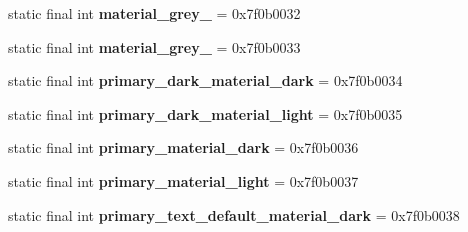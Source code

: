 \begin{DoxyCompactItemize}
\item 
\hypertarget{classandroid_1_1support_1_1v7_1_1appcompat_1_1_r_1_1color_a2e6e9968a655a16317a5d332fa831f10}{}static final int {\bfseries material\+\_\+grey\+\_} = 0x7f0b0032\label{classandroid_1_1support_1_1v7_1_1appcompat_1_1_r_1_1color_a2e6e9968a655a16317a5d332fa831f10}

\item 
\hypertarget{classandroid_1_1support_1_1v7_1_1appcompat_1_1_r_1_1color_a6ec6c6585de5abf315a0289cbf5e3584}{}static final int {\bfseries material\+\_\+grey\+\_} = 0x7f0b0033\label{classandroid_1_1support_1_1v7_1_1appcompat_1_1_r_1_1color_a6ec6c6585de5abf315a0289cbf5e3584}

\item 
\hypertarget{classandroid_1_1support_1_1v7_1_1appcompat_1_1_r_1_1color_a6f3197ffaef2c0dc4af0f27aa444a0e3}{}static final int {\bfseries primary\+\_\+dark\+\_\+material\+\_\+dark} = 0x7f0b0034\label{classandroid_1_1support_1_1v7_1_1appcompat_1_1_r_1_1color_a6f3197ffaef2c0dc4af0f27aa444a0e3}

\item 
\hypertarget{classandroid_1_1support_1_1v7_1_1appcompat_1_1_r_1_1color_abc7e36eaa8300f0592fdf83fd2cdb2bd}{}static final int {\bfseries primary\+\_\+dark\+\_\+material\+\_\+light} = 0x7f0b0035\label{classandroid_1_1support_1_1v7_1_1appcompat_1_1_r_1_1color_abc7e36eaa8300f0592fdf83fd2cdb2bd}

\item 
\hypertarget{classandroid_1_1support_1_1v7_1_1appcompat_1_1_r_1_1color_a56f0defd568d11f4259dceccf4848b29}{}static final int {\bfseries primary\+\_\+material\+\_\+dark} = 0x7f0b0036\label{classandroid_1_1support_1_1v7_1_1appcompat_1_1_r_1_1color_a56f0defd568d11f4259dceccf4848b29}

\item 
\hypertarget{classandroid_1_1support_1_1v7_1_1appcompat_1_1_r_1_1color_ad93abfea5fcbd22376aeea41048ee7c5}{}static final int {\bfseries primary\+\_\+material\+\_\+light} = 0x7f0b0037\label{classandroid_1_1support_1_1v7_1_1appcompat_1_1_r_1_1color_ad93abfea5fcbd22376aeea41048ee7c5}

\item 
\hypertarget{classandroid_1_1support_1_1v7_1_1appcompat_1_1_r_1_1color_add4e227c0820079bd8c7277ed459e013}{}static final int {\bfseries primary\+\_\+text\+\_\+default\+\_\+material\+\_\+dark} = 0x7f0b0038\label{classandroid_1_1support_1_1v7_1_1appcompat_1_1_r_1_1color_add4e227c0820079bd8c7277ed459e013}


\end{DoxyCompactItemize}
